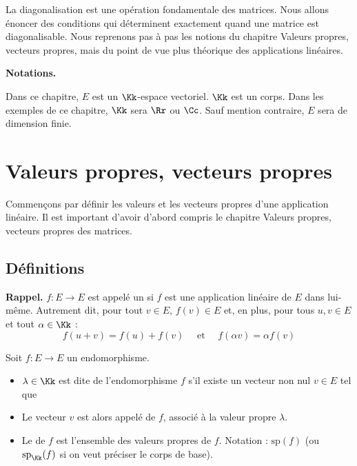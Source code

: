 \documentclass[12pt, class=report,crop=false]{standalone}
\newcommand{\Sp}{\text{sp}}
\begin{document}



La diagonalisation est une opération fondamentale des matrices.
Nous allons énoncer des conditions qui déterminent exactement quand une matrice est diagonalisable.
Nous reprenons pas à pas les notions du chapitre \og{}Valeurs propres, vecteurs propres\fg{},
mais du point de vue plus théorique des applications linéaires.

\bigskip

\textbf{Notations.}

Dans ce chapitre, $E$ est un $\Kk$-espace vectoriel.
$\Kk$ est un corps. Dans les exemples de ce chapitre, $\Kk$ sera $\Rr$ ou $\Cc$.
Sauf mention contraire, $E$ sera de dimension finie.

\section{Valeurs propres, vecteurs propres}

Commençons par définir les valeurs et les vecteurs propres d'une application linéaire.
Il est important d'avoir d'abord compris le chapitre \og{}Valeurs propres, vecteurs propres\fg{}
des matrices.

\subsection{Définitions}

\textbf{Rappel.} $f : E \to E$ est appelé un  si $f$ est une application linéaire de $E$ dans lui-même. Autrement dit, pour tout $v\in E$, $f(v) \in E$ et, en plus, pour tous $u,v \in E$ et tout $\alpha \in \Kk$ :
$$f(u+v) = f(u)+f(v) \quad \text{ et } \quad f(\alpha v) = \alpha f(v)$$

\begin{definition}
Soit $f : E \to E$ un endomorphisme.
\begin{itemize}
  \item $\lambda \in \Kk$ est dite  de l'endomorphisme $f$ s'il
existe un vecteur non nul $v \in E$ tel que 
  \item Le vecteur $v$ est alors appelé  de $f$, associé à la valeur propre $\lambda$.
  
  \item Le  de $f$ est l'ensemble des valeurs propres de $f$. 
  Notation : $\Sp(f)$ (ou $\Sp_\Kk(f)$ si on veut préciser le corps de base). 

\end{itemize}
\end{definition} 
 
\end{document}
